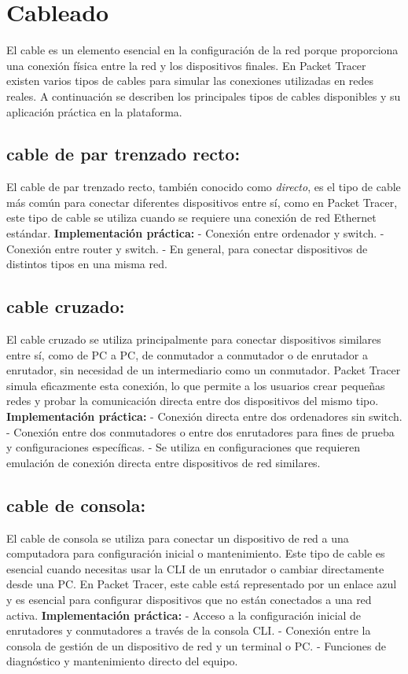 \documentclass[a4paper,12pt]{article}
\begin{document}
\section{Cableado}
El cable es un elemento esencial en la configuración de la red porque proporciona una conexión física entre la red y los dispositivos finales. En Packet Tracer existen varios tipos de cables para simular las conexiones utilizadas en redes reales. A continuación se describen los principales tipos de cables disponibles y su aplicación práctica en la plataforma.
\subsection{cable de par trenzado recto:}
El cable de par trenzado recto, también conocido como \textit{directo}, es el tipo de cable más común para conectar diferentes dispositivos entre sí, como en Packet Tracer, este tipo de cable se utiliza cuando se requiere una conexión de red Ethernet estándar. 
\textbf{Implementación práctica:}
- Conexión entre ordenador y switch. - Conexión entre router y switch. - En general, para conectar dispositivos de distintos tipos en una misma red.
\subsection{cable cruzado:}
El cable cruzado se utiliza principalmente para conectar dispositivos similares entre sí, como de PC a PC, de conmutador a conmutador o de enrutador a enrutador, sin necesidad de un intermediario como un conmutador. Packet Tracer simula eficazmente esta conexión, lo que permite a los usuarios crear pequeñas redes y probar la comunicación directa entre dos dispositivos del mismo tipo. \textbf{Implementación práctica:}
- Conexión directa entre dos ordenadores sin switch. - Conexión entre dos conmutadores o entre dos enrutadores para fines de prueba y configuraciones específicas. - Se utiliza en configuraciones que requieren emulación de conexión directa entre dispositivos de red similares.
\subsection{cable de consola:}
El cable de consola se utiliza para conectar un dispositivo de red a una computadora para configuración inicial o mantenimiento. Este tipo de cable es esencial cuando necesitas usar la CLI de un enrutador o cambiar directamente desde una PC. En Packet Tracer, este cable está representado por un enlace azul y es esencial para configurar dispositivos que no están conectados a una red activa.
\textbf{Implementación práctica:}
- Acceso a la configuración inicial de enrutadores y conmutadores a través de la consola CLI. - Conexión entre la consola de gestión de un dispositivo de red y un terminal o PC. - Funciones de diagnóstico y mantenimiento directo del equipo.
\end{document}
